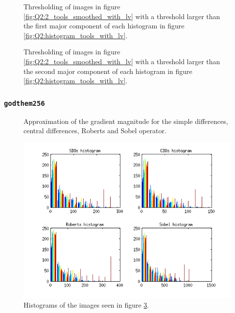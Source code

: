 \begin{figure}[H]
	\centering
	\scalebox{0.9}{}
	\caption{Thresholding of images in figure \ref{fig:Q2:2_tools_smoothed_with_lv} with a threshold larger than the first major component of 
	each histogram in figure \ref{fig:Q2:histogram_tools_with_lv}.}
	\label{fig:Q2:threshold_tools_smoothed_1_with_lv}
\end{figure}

\begin{figure}[H]
	\centering
	\scalebox{0.9}{}
	\caption{Thresholding of images in figure \ref{fig:Q2:2_tools_smoothed_with_lv} with a threshold larger than the second major component of 
	each histogram in figure \ref{fig:Q2:histogram_tools_with_lv}.}
	\label{fig:Q2:threshold_tools_smoothed_2_with_lv}
\end{figure}




\subsubsection{\texttt{godthem256}}

\begin{figure}[H]
	\centering
	\scalebox{0.7}{}
	\caption{Approximation of the gradient magnitude for the simple differences, central differences, Roberts and Sobel operator.}
	\label{fig:Q2:2_house_with_lv}
\end{figure}

\begin{figure}[H]
	\centering
	\includegraphics[scale=0.8]{./images/Q2/with_lv/house/histogram_2.png}
	\caption{Histograms of the images seen in figure \ref{fig:Q2:2_house_with_lv}.}
	\label{fig:Q2:histogram_house_with_lv}
\end{figure}


